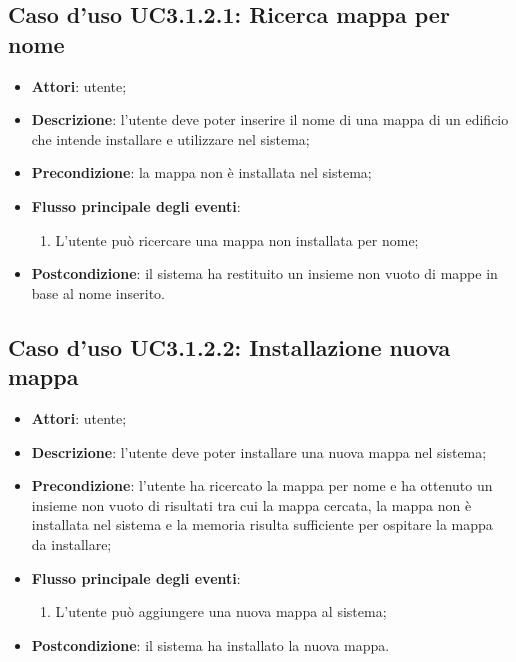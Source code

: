 \documentclass[../AnalisiDeiRequisiti.tex]{subfiles}
\begin{document}
\subsection{Caso d'uso UC3.1.2.1: Ricerca mappa per nome}
\begin{itemize}
	\item \textbf{Attori}: utente;
	\item \textbf{Descrizione}: l'utente deve poter inserire il nome di una mappa di un edificio che intende installare e utilizzare nel sistema; 
	\item \textbf{Precondizione}: la mappa non è installata nel sistema;
	
	\item \textbf{Flusso principale degli eventi}:
	\begin{enumerate}
		\item L'utente può ricercare una mappa non installata per nome;
		
	\end{enumerate}
	\item \textbf{Postcondizione}: il sistema ha restituito un insieme non vuoto di mappe in base al nome inserito.
\end{itemize}
\hypertarget{UC3.1.2.2}{}
\subsection{Caso d'uso UC3.1.2.2: Installazione nuova mappa}
\begin{itemize}
	\item \textbf{Attori}: utente;
	\item \textbf{Descrizione}: l'utente deve poter installare una nuova mappa nel sistema; 
	\item \textbf{Precondizione}: l'utente ha ricercato la mappa per nome e ha ottenuto un insieme non vuoto di risultati tra cui la mappa cercata, la mappa non è installata nel sistema e la memoria risulta sufficiente per ospitare la mappa da installare;
	
	\item \textbf{Flusso principale degli eventi}:
	\begin{enumerate}
		\item L'utente può aggiungere una nuova mappa al sistema;
		
	\end{enumerate}
	\item \textbf{Postcondizione}: il sistema ha installato la nuova mappa.
\end{itemize}
\hypertarget{UC3.1.2.3}{}
\end{document}

